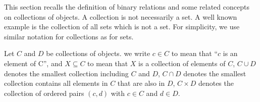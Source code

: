 This section recalls the definition of binary relations and some related concepts on collections of objects.
A collection is not necessarily a set. A well known example is the collection of all sets which is not a set. For simplicity, we use similar notation for collections as for sets.  
\begin{notation}
    Let $C$ and $D$ be collections of objects. 
    we write $c \in C$ to mean that \enquote{$c$ is an element of C}, 
    and $X \subseteq C$ to mean that $X$ is a collection of elements of $C$,
    $C \cup D$ denotes the smallest collection including $C$ and $D$,
    $C \cap D$ denotes the smallest collection contains all elements in $C$ that are also in $D$,
    $C \times D$ denotes the collection of ordered pairs $(c,d)$ with $c \in C$ and $d \in D$.
  \end{notation} 
    
    
